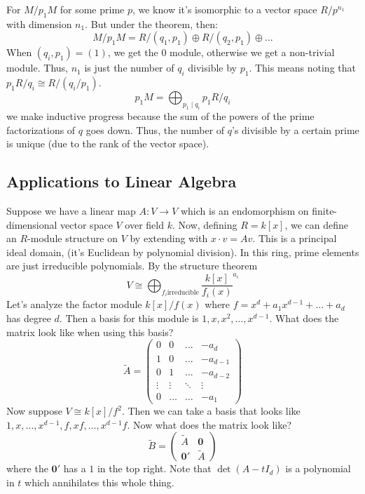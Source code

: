 For $M/p_1 M$ for some prime $p$, we know it's isomorphic to a vector space $R/p^{n_1}$
with dimension $n_1$. But under the theorem, then:
\[ M/p_1 M = R/(q_1, p_1) \oplus R/(q_2, p_1) \oplus \dots \]
When $(q_i, p_1) = (1)$, we get the $0$ module, otherwise we get a non-trivial module. Thus,
$n_1$ is just the number of $q_i$ divisible by $p_1$. This means noting that $p_1 R/q_i \cong R/(q_i/p_1)$.
\[ p_1 M = \bigoplus_{p_1 \mid q_i} p_1 R/q_i \]
we make inductive progress because the sum of the powers of the prime factorizations of $q$ goes down.
Thus, the number of $q$'s divisible by a certain prime is unique (due to the rank of the vector space).

\subsection{Applications to Linear Algebra}
Suppose we have a linear map $A: V \to V$ which is an endomorphism on finite-dimensional vector space $V$ over field $k$.
Now, defining $R = k[x]$, we can define an $R$-module structure on $V$
by extending with $x \cdot v = Av$. This is a principal ideal domain,
(it's Euclidean by polynomial division). In this ring, prime elements are just irreducible polynomials.
By the structure theorem
\[ V \cong \bigoplus_{f_i \text{irreducible}} \frac{k[x]}{f_i(x)}^{a_i} \]
Let's analyze the factor module
$k[x]/f(x)$ where $f = x^d + a_1 x^{d - 1} + \dots + a_d$ has degree $d$. Then a basis for this module is $1, x, x^2, \dots, x^{d - 1}$.
What does the matrix look like when using this basis?
\[ \tilde{A} = \begin{pmatrix}
    0 & 0 & \dots & -a_d\\
    1 & 0 & \dots & -a_{d - 1} \\
    0 & 1 & \dots & -a_{d - 2} \\
    \vdots & \vdots &\ddots & \vdots \\
    0 & \dots & \dots & -a_1
\end{pmatrix} \]
Now suppose $V \cong k[x]/f^2$. Then we can take a basis that looks like $1, x, \dots, x^{d - 1}, f, xf, \dots, x^{d - 1}f$.
Now what does the matrix look like?
\[ \tilde{B} = \begin{pmatrix}
    \tilde{A} & \mathbf{0} \\
    \mathbf{0'} & \tilde{A}
\end{pmatrix}
\]
where the $\mathbf{0'}$ has a $1$ in the top right.
Note that $\det(A - tI_d)$ is a polynomial in $t$ which annihilates this whole thing.